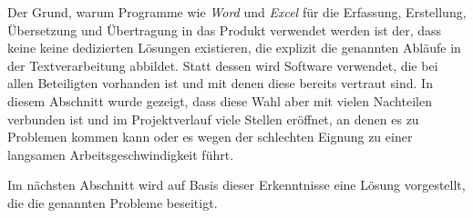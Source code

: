 Der Grund, warum Programme wie \emph{Word} und \emph{Excel} für die Erfassung, Erstellung, Übersetzung und Übertragung in das Produkt verwendet werden ist der, dass keine keine dedizierten Lösungen existieren, die explizit die genannten Abläufe in der Textverarbeitung abbildet. Statt dessen wird Software verwendet, die bei allen Beteiligten vorhanden ist und mit denen diese bereits vertraut sind. In diesem Abschnitt wurde gezeigt, dass diese Wahl aber mit vielen Nachteilen verbunden ist und im Projektverlauf viele Stellen eröffnet, an denen es zu Problemen kommen kann oder es wegen der schlechten Eignung zu einer langsamen Arbeitsgeschwindigkeit führt.

Im nächsten Abschnitt wird auf Basis dieser Erkenntnisse eine Lösung vorgestellt, die die genannten Probleme beseitigt.
